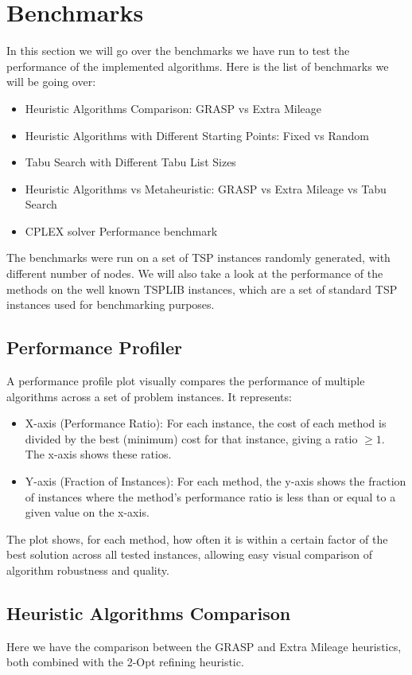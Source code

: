 \documentclass{article}
\begin{document}
\section{Benchmarks}
In this section we will go over the benchmarks we have run to test the performance of the implemented algorithms. Here is the list of benchmarks we will be going over:
\begin{itemize}
	\item Heuristic Algorithms Comparison: GRASP vs Extra Mileage
	\item Heuristic Algorithms with Different Starting Points: Fixed vs Random
	\item Tabu Search with Different Tabu List Sizes
	\item Heuristic Algorithms vs Metaheuristic: GRASP vs Extra Mileage vs Tabu Search 
	\item CPLEX solver Performance benchmark
\end{itemize}
The benchmarks were run on a set of TSP instances randomly generated, with different number of nodes. We will also take a look at the performance of the methods on 
the well known TSPLIB instances, which are a set of standard TSP instances used for benchmarking purposes.

\subsection{Performance Profiler}
A performance profile plot visually compares the performance of multiple algorithms across a set of problem instances.
It represents:
\begin{itemize}
	\item X-axis (Performance Ratio): For each instance, the cost of each method is divided by the best (minimum) cost for that instance, giving a ratio $\geq 1$. The x-axis shows these ratios.
	\item Y-axis (Fraction of Instances): For each method, the y-axis shows the fraction of instances where the method's performance ratio is less than or equal to a given value on the x-axis.
\end{itemize}
The plot shows, for each method, how often it is within a certain factor of the best solution across all tested instances, 
allowing easy visual comparison of algorithm robustness and quality.

\subsection{Heuristic Algorithms Comparison}
Here we have the comparison between the GRASP and Extra Mileage heuristics, both combined with the 2-Opt refining heuristic.
\end{document}
